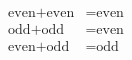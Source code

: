 \documentclass[preview]{standalone}
\begin{document}
\begin{align*}
\begin{aligned} \text{even} + \text{even} &= \text{even} \\ \text{odd} + \text{odd} &= \text{even} \\ \text{even} + \text{odd} &= \text{odd} \end{aligned}
\end{align*}
\end{document}
